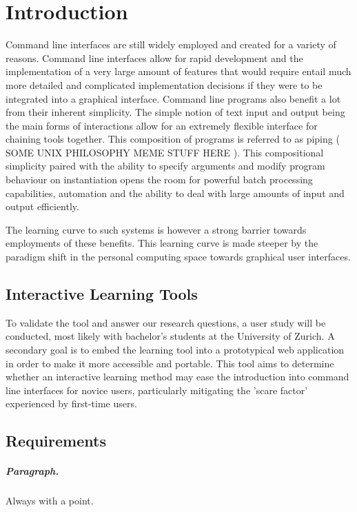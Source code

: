 \chapter{Introduction}
\label{chap:intro}

Command line interfaces are still widely employed and created for a variety of
reasons. Command line interfaces allow for rapid development and the
implementation of a very large amount of features that would require entail
much more detailed and complicated implementation decisions if they were to be
integrated into a graphical interface. Command line programs also benefit a lot
from their inherent simplicity. The simple notion of text input and output
being the main forms of interactions allow for an extremely flexible interface
for chaining tools together. This composition of programs is referred to as
piping ( SOME UNIX PHILOSOPHY MEME STUFF HERE ). This compositional simplicity
paired with the ability to specify arguments and modify program behaviour on
instantiation opens the room for powerful batch processing capabilities,
automation and the ability to deal with large amounts of input and output
efficiently.

The learning curve to such systems is however a strong barrier towards
employments of these benefits. This learning curve is made steeper by the
paradigm shift in the personal computing space towards graphical user
interfaces.



\section{Interactive Learning Tools}
To validate the tool and answer our
research questions, a user study will be conducted, most likely with bachelor's
students at the University of Zurich. A secondary goal is to embed the learning
tool into a prototypical web application in order to make it more accessible
and portable.
This tool aims to determine whether an interactive learning method may ease the
introduction into command line interfaces for novice users, particularly
mitigating the 'scare factor' experienced by first-time users. 

\section{Requirements}

\paragraph{Paragraph.} Always with a point.

